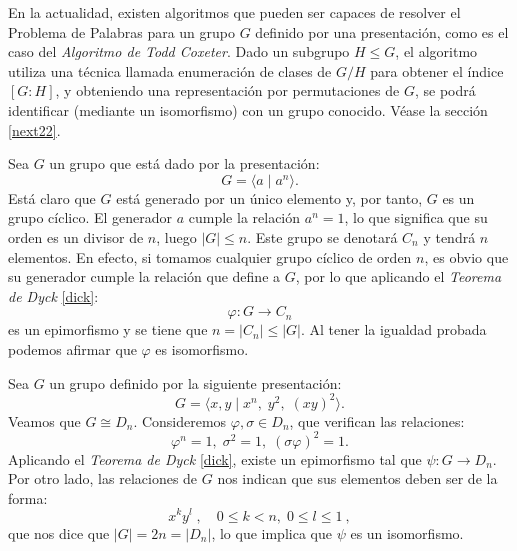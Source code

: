 En la actualidad, existen algoritmos que pueden ser capaces de resolver el Problema de Palabras para un grupo $G$ definido por una presentación, como es el caso del \textit{Algoritmo de Todd Coxeter}.  Dado un subgrupo $H\leq G$, el algoritmo utiliza una técnica llamada enumeración de clases de $G/H$ para obtener el índice $[G:H]$, y obteniendo una representación por permutaciones de $G$, se podrá identificar (mediante un isomorfismo) con un grupo conocido. Véase la sección \ref{next22}.



\begin{Ejemplo}
Sea $G$ un grupo que está dado por la presentación:
\[
    G = \langle a \mid a^n \rangle .
\]
Está claro que $G$ está generado por un único elemento y, por tanto, $G$ es un grupo cíclico. El generador $a$ cumple la relación $a^n=1$, lo que significa que su orden es un divisor de $n$, luego $|G| \leq n$. Este grupo se denotará $C_n$ y tendrá $n$ elementos. En efecto, si tomamos cualquier grupo cíclico de orden $n$, es obvio que su generador cumple la relación que define a $G$, por lo que aplicando el \textit{Teorema de Dyck} \ref{dick}:
\[
    \varphi \colon G \rightarrow C_n
\]
es un epimorfismo y se tiene que $n = |C_n| \leq |G|$. Al tener la igualdad probada podemos afirmar que $\varphi$ es isomorfismo.
\end{Ejemplo}









\begin{Ejemplo}
Sea $G$ un grupo definido por la siguiente presentación:
\[
    G = \langle x, y \mid x^n, \; y^2, \; (xy)^2 \rangle .
\]
Veamos que $G \cong D_n$. Consideremos $\varphi , \sigma \in D_n$, que verifican las relaciones:
\[
    \varphi^n=1, \; \sigma^2 = 1, \; (\sigma\varphi)^2=1 .
\]
Aplicando el \textit{Teorema de Dyck} \ref{dick}, existe un epimorfismo tal que $\psi \colon G \rightarrow D_n$. 
Por otro lado, las relaciones de $G$ nos indican que sus elementos deben ser de la forma:
\[
    x^ky^l \; , \quad 0 \leq k < n ,\; 0\leq l \leq 1 \: ,
\]
que nos dice que $|G|= 2n =|D_n|$, lo que implica que $\psi$ es un isomorfismo.
\end{Ejemplo}




